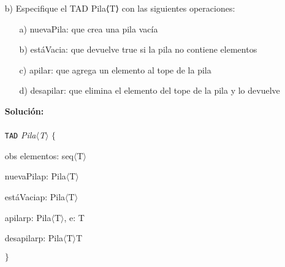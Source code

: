\documentclass{article}
\newenvironment{tad}[1]{
	\paragraph{} \vspace*{-4mm}
	\newcommand{\obs}[2]{\texttt{obs} ##1 : ##2}

	\vspace{1ex}
	\texttt{TAD} \textit{#1} $\{$
	\par
	\tocarEspacios
}
{

\hspace{2.5mm} $\}$
\vspace{2ex}
}
\begin{document}
\begin{itemize}
    \item [b)] Especifique el TAD Pila⟨T⟩ con las siguientes operaciones:
    \begin{itemize}
        \item [a)] nuevaPila: que crea una pila vac\'ia
        \item [b)] est\'aVacia: que devuelve true si la pila no contiene elementos
        \item [c)] apilar: que agrega un elemento al tope de la pila
        \item [d)] desapilar: que elimina el elemento del tope de la pila y lo devuelve
    \end{itemize}
    \textbf{Soluci\'on:}
    \begin{tad}{Pila$\langle$T$\rangle$}
        obs elementos: seq$\langle$T$\rangle$

        \begin{proc}{nuevaPila}{\Inout p: Pila$\langle$T$\rangle$}{}
        \end{proc}

        \begin{proc}{est\'aVacia}{\In p: Pila$\langle$T$\rangle$}{\bool}
        \end{proc}

        \begin{proc}{apilar}{\Inout p: Pila$\langle$T$\rangle$, \In e: T}{}
        \end{proc}

        \begin{proc}{desapilar}{\Inout p: Pila$\langle$T$\rangle$}{T}
        \end{proc}
        
    \end{tad}


\end{itemize}
\end{document}
